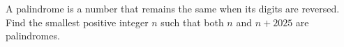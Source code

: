 A palindrome is a number that remains the same when its digits are reversed. Find the smallest positive integer $n$ such that both $n$ and $n + 2025$ are palindromes.

